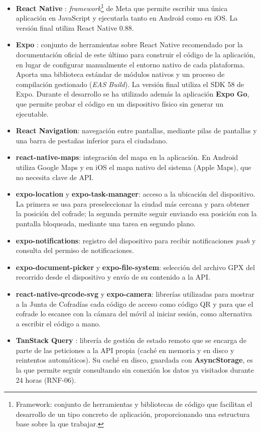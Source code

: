 \begin{itemize}
    \item \textbf{React Native} \cite{reactnative}: \emph{framework}\footnote{Framework: conjunto de herramientas y bibliotecas de código que facilitan el desarrollo de un tipo concreto de aplicación, proporcionando una estructura base sobre la que trabajar.} de Meta que permite escribir una única aplicación en JavaScript y ejecutarla tanto en Android como en iOS. La versión final utiliza React Native 0.88.
    \item \textbf{Expo} \cite{expo}: conjunto de herramientas sobre React Native recomendado por la documentación oficial de este último \cite{reactnative} para construir el código de la aplicación, en lugar de configurar manualmente el entorno nativo de cada plataforma. Aporta una biblioteca estándar de módulos nativos y un proceso de compilación gestionado (\emph{EAS Build}). La versión final utiliza el SDK 58 de Expo. Durante el desarrollo se ha utilizado además la aplicación \textbf{Expo Go}, que permite probar el código en un dispositivo físico sin generar un ejecutable.
    \item \textbf{React Navigation}: navegación entre pantallas, mediante pilas de pantallas y una barra de pestañas inferior para el ciudadano.
    \item \textbf{react-native-maps}: integración del mapa en la aplicación. En Android utiliza Google Maps y en iOS el mapa nativo del sistema (Apple Maps), que no necesita clave de API.
    \item \textbf{expo-location} y \textbf{expo-task-manager}: acceso a la ubicación del dispositivo. La primera se usa para preseleccionar la ciudad más cercana y para obtener la posición del cofrade; la segunda permite seguir enviando esa posición con la pantalla bloqueada, mediante una tarea en segundo plano.
    \item \textbf{expo-notifications}: registro del dispositivo para recibir notificaciones \emph{push} y consulta del permiso de notificaciones.
    \item \textbf{expo-document-picker} y \textbf{expo-file-system}: selección del archivo GPX del recorrido desde el dispositivo y envío de su contenido a la API.
    \item \textbf{react-native-qrcode-svg} y \textbf{expo-camera}: librerías utilizadas para mostrar a la Junta de Cofradías cada código de acceso como código QR y para que el cofrade lo escanee con la cámara del móvil al iniciar sesión, como alternativa a escribir el código a mano.
    \item \textbf{TanStack Query} \cite{reactquery}: librería de gestión de estado remoto que se encarga de parte de las peticiones a la API propia (caché en memoria y en disco y reintentos automáticos). Su caché en disco, guardada con \textbf{AsyncStorage}, es la que permite seguir consultando sin conexión los datos ya visitados durante 24 horas (RNF-06).
\end{itemize}

